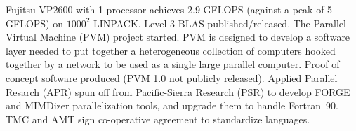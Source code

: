 	{Fujitsu VP2600 with 1 processor achieves 2.9 GFLOPS
	(against a peak of 5 GFLOPS)
	on $1000^2$ LINPACK.}
        {Level 3 BLAS published/released.
        The Parallel Virtual Machine (PVM) project started.
        PVM is designed to develop a software layer needed to put
        together a heterogeneous collection of computers hooked together 
        by a network to be used as a single large parallel computer.
        Proof of concept software produced (PVM 1.0 not publicly released).}
	{Applied Parallel Resarch (APR) spun off from
	Pacific-Sierra Research (PSR) to develop FORGE and MIMDizer
	parallelization tools,
	and upgrade them to handle Fortran~90.}
	{TMC and AMT sign co-operative agreement to standardize languages.}


